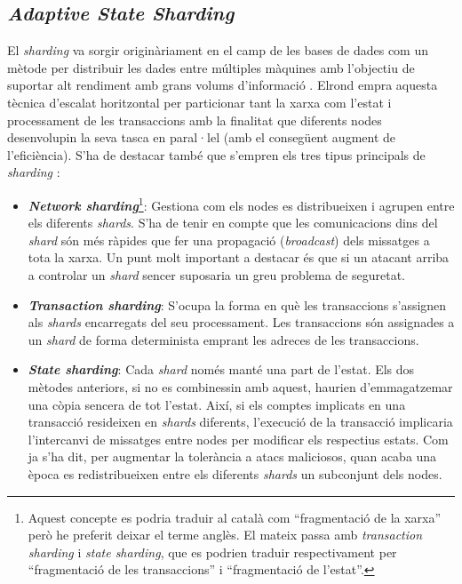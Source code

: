 \documentclass[11pt,a4paper]{article}
\begin{document}
\subsection{\textit{Adaptive State Sharding}}
El \textit{sharding} va sorgir originàriament en el camp de les bases de dades com un mètode per distribuir les dades entre múltiples màquines amb l'objectiu de suportar alt rendiment amb grans volums d'informació \cite{mongodb2021}. Elrond empra aquesta tècnica d'escalat horitzontal per particionar tant la xarxa com l'estat i processament de les transaccions amb la finalitat que diferents nodes desenvolupin la seva tasca en paral·lel (amb el consegüent augment de l'eficiència). S'ha de destacar també que s'empren els tres tipus principals de \textit{sharding} \cite{elrond2022}:

\begin{itemize}
	\item \textbf{\textit{Network sharding}}\footnote{Aquest concepte es podria traduir al català com ``fragmentació de la xarxa'' però he preferit deixar el terme anglès. El mateix passa amb \textit{transaction sharding} i \textit{state sharding}, que es podrien traduir respectivament per ``fragmentació de les transaccions'' i ``fragmentació de l'estat''.}: Gestiona com els nodes es distribueixen i agrupen entre els diferents \textit{shards}. S'ha de tenir en compte que les comunicacions dins del \textit{shard} són més ràpides que fer una propagació (\textit{broadcast}) dels missatges a tota la xarxa. Un punt molt important a destacar és que si un atacant arriba a controlar un \textit{shard} sencer suposaria un greu problema de seguretat. 
	\item \textbf{\textit{Transaction sharding}}: S'ocupa la forma en què les transaccions s'assignen als \textit{shards} encarregats del seu processament. Les transaccions són assignades a un \textit{shard} de forma determinista emprant les adreces de les transaccions.
	\item \textbf{\textit{State sharding}}: Cada \textit{shard} només manté una part de l'estat. Els dos mètodes anteriors, si no es combinessin amb aquest, haurien d'emmagatzemar una còpia sencera de tot l'estat. Així, si els comptes implicats en una transacció resideixen en \textit{shards} diferents, l'execució de la transacció implicaria l'intercanvi de missatges entre nodes per modificar els respectius estats. Com ja s'ha dit, per augmentar la tolerància a atacs maliciosos, quan acaba una època es redistribueixen entre els diferents \textit{shards} un subconjunt dels nodes.
\end{itemize}
\end{document}
